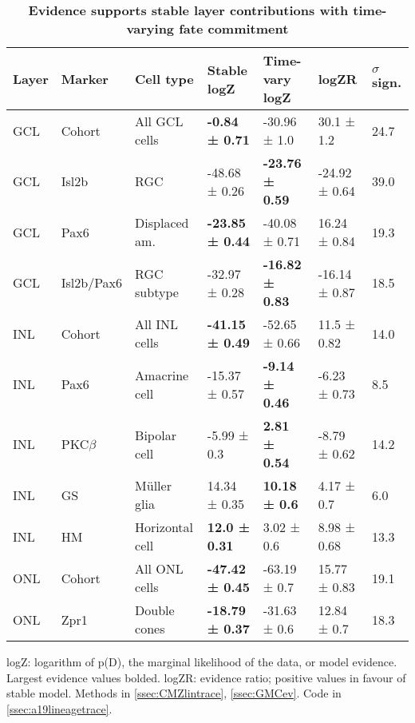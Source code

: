 \begin{table}[!ht]
    \caption{{\bf Evidence supports stable layer contributions with time-varying fate commitment}}
    \begin{tabular}{|l|l|l|l|l|l|l|} 
        \hline
        {\bf Layer} & {\bf Marker} & {\bf Cell type} & {\bf Stable logZ} & {\bf Time-vary logZ} & {\bf logZR} & {\bf $\sigma$ sign.}\\ \hline \hline
        GCL & Cohort & All GCL cells & {\bf -0.84 ± 0.71} & -30.96 ± 1.0 & 30.1 ± 1.2 & 24.7\\ \hline \hline
        GCL & Isl2b & RGC & -48.68 ± 0.26 & {\bf -23.76 ± 0.59} & -24.92 ± 0.64 & 39.0\\ \hline
        GCL & Pax6 & Displaced am. & {\bf -23.85 ± 0.44} & -40.08 ± 0.71 & 16.24 ± 0.84 & 19.3\\ \hline
        GCL & Isl2b/Pax6 & RGC subtype & -32.97 ± 0.28 & {\bf -16.82 ± 0.83} & -16.14 ± 0.87 & 18.5\\ \hline \hline
        INL & Cohort & All INL cells & {\bf -41.15 ± 0.49} & -52.65 ± 0.66 & 11.5 ± 0.82 & 14.0\\ \hline \hline
        INL & Pax6 & Amacrine cell & -15.37 ± 0.57 & {\bf -9.14 ± 0.46} & -6.23 ± 0.73 & 8.5\\ \hline
        INL & PKC$\beta$ & Bipolar cell & -5.99 ± 0.3 & {\bf 2.81 ± 0.54} & -8.79 ± 0.62 & 14.2\\ \hline
        INL & GS & M\"{u}ller glia & 14.34 ± 0.35 & {\bf 10.18 ± 0.6} & 4.17 ± 0.7 & 6.0\\ \hline
        INL & HM & Horizontal cell & {\bf 12.0 ± 0.31} &  3.02 ± 0.6 & 8.98 ± 0.68 & 13.3\\ \hline \hline
        ONL & Cohort & All ONL cells & {\bf -47.42 ± 0.45} & -63.19 ± 0.7 & 15.77 ± 0.83 & 19.1\\ \hline \hline
        ONL & Zpr1 & Double cones & {\bf -18.79 ± 0.37} & -31.63 ± 0.6 & 12.84 ± 0.7 & 18.3\\ \hline
    \end{tabular}
    \begin{flushleft}logZ: logarithm of p(D), the marginal likelihood of the data, or model evidence.  Largest evidence values bolded. logZR: evidence ratio; positive values in favour of stable model.
    Methods in \autoref{ssec:CMZlintrace}, \autoref{ssec:GMCev}.
    Code in \autoref{ssec:a19lineagetrace}.    
    \end{flushleft}
    \label{lineage_ev}
\end{table}

